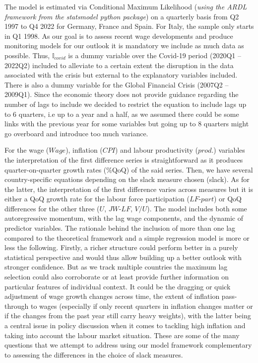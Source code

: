 The model is estimated via Conditional Maximum Likelihood (\textit{using the ARDL framework from the statsmodel python package}) on a quarterly basis from Q2 1997 to Q4 2022 for Germany, France and Spain. 
For Italy, the sample only starts in Q1 1998. As our goal is to assess recent wage developments and produce monitoring models for our outlook it is mandatory we include as much data as possible. 
Thus, $\mathbb{I}_{covid}$ is a dummy variable over the Covid-19 period (2020Q1 – 2022Q2) included to alleviate to a certain extent the disruption in the data associated with the crisis but external to the explanatory variables included. 
There is also a dummy variable for the Global Financial Crisis (2007Q2 – 2009Q1). 
Since the economic theory does not provide guidance regarding the number of lags to include we decided to restrict the equation to include lags up to 6 quarters, i.e up to a year and a half, as we assumed there could be some links with the previous year for some variables but going up to 8 quarters might go overboard and introduce too much variance.

For the wage ($Wage$), inflation ($CPI$) and labour productivity ($prod.$) variables the interpretation of the first difference series is straightforward as it produces quarter-on-quarter growth rates (\%QoQ) of the said series. 
Then, we have several country-specific equations depending on the slack measure chosen (slack). 
As for the latter, the interpretation of the first difference varies across measures but it is either a QoQ growth rate for the labour force participation ($LF\textrm{-}part$) or QoQ differences for the other three ($U$, $JW\textrm{-}LF$, $V/U$). 
The model includes both some autoregressive momentum, with the lag wage components, and the dynamic of predictor variables. 
The rationale behind the inclusion of more than one lag compared to the theoretical framework and a simple regression model is more or less the following. 
Firstly, a richer structure could perform better in a purely statistical perspective and would thus allow building up a better outlook with stronger confidence. 
But as we track multiple countries the maximum lag selection could also corroborate or at least provide further information on particular features of individual context. It could be the dragging or quick adjustment of wage growth changes across time, the extent of inflation pass-through to wages (especially if only recent quarters in inflation changes matter or if the changes from the past year still carry heavy weights), with the latter being a central issue in policy discussion when it comes to tackling high inflation and taking into account the labour market situation. 
These are some of the many questions that we attempt to address using our model framework complementary to assessing the differences in the choice of slack measures.

